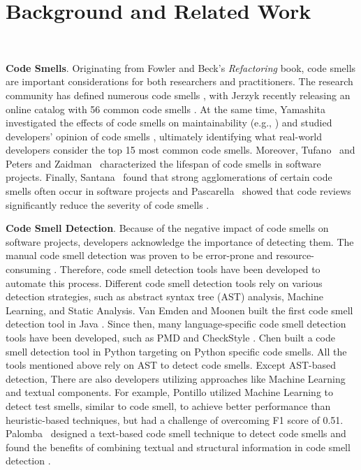 \vspace*{-0.5em}

\section{Background and Related Work}~\label{sec:background}

\vspace*{-1em}


{\bf Code Smells}. Originating from Fowler and Beck's \textit{Refactoring}
book, code smells are important considerations for both researchers and
practitioners. The research community has defined numerous code smells
\cite{Pysmell,SQLAntipatterns,CleanCode,RefactoringWorkbook}, with Jerzyk
recently releasing an online catalog with 56 common code smells
\cite{Jerzyk2023}. At the same time, Yamashita investigated the effects of code
smells on maintainability (e.g., \cite{6392174, 6405287}) and studied
developers' opinion of code smells \cite{developersCare}, ultimately
identifying what real-world developers consider the top 15 most common code
smells. Moreover, Tufano~\etal{} \cite{whenandwhy} and Peters and
Zaidman~\cite{lifespan} characterized the lifespan of code smells in software
projects. Finally, Santana~\etal{} found that strong agglomerations of certain
code smells often occur in software projects \cite{Santana} and
Pascarella~\etal{} showed that code reviews significantly reduce the severity
of code smells \cite{Pascarella}.

{\bf Code Smell Detection}. Because of the negative impact of code smells on
software projects, developers acknowledge the importance of detecting them. The
manual code smell detection was proven to be error-prone and resource-consuming
\cite{DetectingDefectsInObject}. Therefore, code smell detection tools have been
developed to automate this process. Different code smell detection tools rely on
various detection strategies, such as abstract syntax tree (AST) analysis,
Machine Learning, and Static Analysis. Van Emden and Moonen built the first code
smell detection tool in Java \cite{1173068}. Since then, many language-specific
code smell detection tools have been developed, such as PMD \cite{PMD} and
CheckStyle \cite{CheckStyle}. Chen \cite{Pysmell} built a code smell detection
tool in Python targeting on Python specific code smells. All the tools mentioned
above rely on AST to detect code smells. Except AST-based detection, There are
also developers utilizing approaches like Machine Learning and textual
components. For example, Pontillo utilized Machine Learning to detect test
smells, similar to code smell, to achieve better performance than
heuristic-based techniques, but had a challenge of overcoming F1 score of 0.51.
Palomba~\etal{} designed a text-based code smell technique to detect code smells
and found the benefits of combining textual and structural information in code
smell detection \cite{Palomba}.

